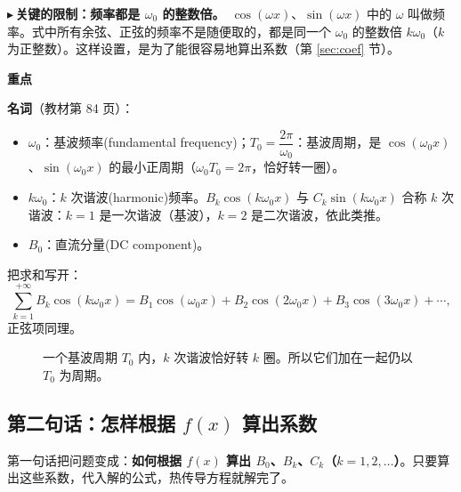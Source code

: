 \documentclass[UTF8,a4paper,11pt]{ctexart}
\newenvironment{remember}{\begin{rememberbox}\textbf{重点}\par\smallskip}{\end{rememberbox}}
\newcommand{\taxes}[5][t]{%
  \draw[->] (#2,0) -- (#3,0) node[right,font=\scriptsize] {$#1$};
  \draw[->] (0,#5) -- (0,#4);
  \node[anchor=north east,font=\tiny,gray!60!black,inner sep=1pt] at (0,-0.02) {$0$};}
\newcommand{\xt}[2]{\draw (#1,0) -- (#1,-0.1) node[anchor=north,font=\tiny,gray!60!black,fill=white,inner sep=0.6pt] {$#2$};}
\newcommand{\yt}[2]{\draw (0,#1) -- (-0.1,#1) node[anchor=east,font=\tiny,gray!60!black,fill=white,inner sep=0.6pt] {$#2$};}
\newcounter{ex}[section]
\newcommand{\point}[1]{\par\addvspace{1ex}\noindent\textcolor{ptteal}{$\blacktriangleright$\,\textbf{#1}}\ }
\begin{document}
\point{关键的限制：频率都是 $\omega_0$ 的整数倍。}$\cos(\omega x)$、$\sin(\omega x)$ 中的 $\omega$ 叫做频率。式中所有余弦、正弦的频率不是随便取的，都是同一个 $\omega_0$ 的整数倍 $k\omega_0$（$k$ 为正整数）。这样设置，是为了能很容易地算出系数（第 \ref{sec:coef} 节）。

\begin{remember}
\textbf{名词}（教材第 84 页）：
\begin{itemize}[nosep]
\item $\omega_0$：基波频率(fundamental frequency)；$T_0=\dfrac{2\pi}{\omega_0}$：基波周期，是 $\cos(\omega_0x)$、$\sin(\omega_0x)$ 的最小正周期（$\omega_0T_0=2\pi$，恰好转一圈）。
\item $k\omega_0$：$k$ 次谐波(harmonic)频率。$B_k\cos(k\omega_0x)$ 与 $C_k\sin(k\omega_0x)$ 合称 $k$ 次谐波：$k=1$ 是一次谐波（基波），$k=2$ 是二次谐波，依此类推。
\item $B_0$：直流分量(DC component)。
\end{itemize}
\end{remember}

把求和写开：
\[
\sum_{k=1}^{+\infty}B_k\cos(k\omega_0x)=B_1\cos(\omega_0x)+B_2\cos(2\omega_0x)+B_3\cos(3\omega_0x)+\cdots,
\]
正弦项同理。

\begin{figure}[H]
\centering
{}
\caption{一个基波周期 $T_0$ 内，$k$ 次谐波恰好转 $k$ 圈。所以它们加在一起仍以 $T_0$ 为周期。}
\end{figure}

\subsection{第二句话：怎样根据 \texorpdfstring{$f(x)$}{f(x)} 算出系数}
第一句话把问题变成：\textbf{如何根据 $f(x)$ 算出 $B_0$、$B_k$、$C_k$（$k=1,2,\dots$）}。只要算出这些系数，代入解的公式，热传导方程就解完了。
\end{document}

